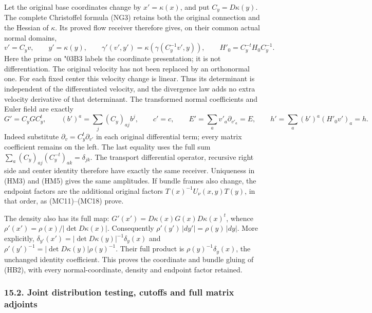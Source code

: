 \documentclass[
  11pt,
]{article}
\begin{document}
Let the original base coordinates change by \(x'=\kappa(x)\), and put
\(C_y=D\kappa(y)\). The complete Christoffel formula (NG3) retains both
the original connection and the Hessian of \ensuremath{\kappa}. Its proved flow receiver
therefore gives, on their common actual normal domains, \[
v'=C_yv,\qquad y'=\kappa(y),\qquad
\gamma'(v',y')=\kappa(\gamma(C_y^{-1}v',y)),\qquad
H'_0=C_y^{-t}H_0C_y^{-1}.
\tag{HD1}
\] Here the prime on {\ReaderSymbols\char"03B3} labels the coordinate presentation; it is not
differentiation. The original velocity has not been replaced by an
orthonormal one. For each fixed center this velocity change is linear.
Thus its determinant is independent of the differentiated velocity, and
the divergence law adds no extra velocity derivative of that
determinant. The transformed normal coefficients and Euler field are
exactly {\small
\[
G'=C_yGC_y^t,\qquad
(b')^a=\sum_j(C_y)_{aj}b^j,\qquad c'=c,
\qquad E'=\sum_av'_a\partial_{v'_a}=E,
\qquad h'=\sum_a(b')^a(H'_0v')_a=h.
\tag{HD2}
\]
} Indeed substitute \(\partial_v=C_y^t\partial_{v'}\) in each original
differential term; every matrix coefficient remains on the left. The
last equality uses the full sum
\(\sum_a(C_y)_{aj}(C_y^{-t})_{ak}=\delta_{jk}\). The transport
differential operator, recursive right side and center identity
therefore have exactly the same receiver. Uniqueness in (HM3) and (HM5)
gives the same amplitudes. If bundle frames also change, the endpoint
factors are the additional original factors \(T(x)^{-1}U_\nu(x,y)T(y)\),
in that order, as (MC11)--(MC18) prove.

The density also has its full map:
\(G'(x')=D\kappa(x)G(x)D\kappa(x)^t\), whence
\(\rho'(x')=\rho(x)/|\det D\kappa(x)|\). Consequently
\(\rho'(y')\,|dy'|=\rho(y)\,|dy|\). More explicitly,
\(\delta_{y'}(x')=|\det D\kappa(y)|^{-1}\delta_y(x)\) and
\(\rho'(y')^{-1}=|\det D\kappa(y)|\rho(y)^{-1}\). Their full product is
\(\rho(y)^{-1}\delta_y(x)\), the unchanged identity coefficient. This
proves the coordinate and bundle gluing of (HB2), with every
normal-coordinate, density and endpoint factor retained.

\subsubsection{15.2. Joint distribution testing, cutoffs and full matrix
adjoints}\label{joint-distribution-testing-cutoffs-and-full-matrix-adjoints}
\end{document}
